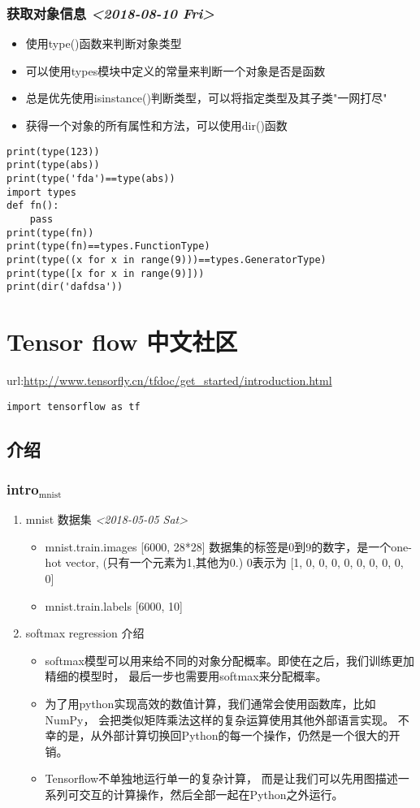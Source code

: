 \documentclass[11pt]{article}
\begin{document}
\subsubsection{获取对象信息 \textit{<2018-08-10 Fri>}}
\label{sec:org1f0ade8}
\begin{itemize}
\item 使用type()函数来判断对象类型
\item 可以使用types模块中定义的常量来判断一个对象是否是函数
\item 总是优先使用isinstance()判断类型，可以将指定类型及其子类"一网打尽"
\item 获得一个对象的所有属性和方法，可以使用dir()函数
\end{itemize}
\begin{verbatim}
print(type(123))
print(type(abs))
print(type('fda')==type(abs))
import types
def fn():
    pass
print(type(fn))
print(type(fn)==types.FunctionType)
print(type((x for x in range(9)))==types.GeneratorType)
print(type([x for x in range(9)]))
print(dir('dafdsa'))
\end{verbatim}

\section{Tensor flow 中文社区}
\label{sec:org1c314b4}
url:\url{http://www.tensorfly.cn/tfdoc/get\_started/introduction.html}
\begin{verbatim}
import tensorflow as tf
\end{verbatim}
\subsection{介绍}
\label{sec:org90bd633}
\subsubsection{intro\(_{\text{mnist}}\)}
\label{sec:orgbf281e2}
\begin{enumerate}
\item mnist 数据集 \textit{<2018-05-05 Sat>}
\label{sec:orgd12657b}
\begin{itemize}
\item mnist.train.images [6000, 28*28]
数据集的标签是0到9的数字，是一个one-hot vector, (只有一个元素为1,其他为0.)
0表示为 [1, 0, 0, 0, 0, 0, 0, 0, 0, 0]
\item mnist.train.labels [6000, 10]
\end{itemize}
\item softmax regression 介绍
\label{sec:orgb1cfec8}
\begin{itemize}
\item softmax模型可以用来给不同的对象分配概率。即使在之后，我们训练更加精细的模型时，
最后一步也需要用softmax来分配概率。
\item 为了用python实现高效的数值计算，我们通常会使用函数库，比如NumPy，
会把类似矩阵乘法这样的复杂运算使用其他外部语言实现。
不幸的是，从外部计算切换回Python的每一个操作，仍然是一个很大的开销。
\item Tensorflow不单独地运行单一的复杂计算，
而是让我们可以先用图描述一系列可交互的计算操作，然后全部一起在Python之外运行。
\end{itemize}
\end{enumerate}
\end{document}

